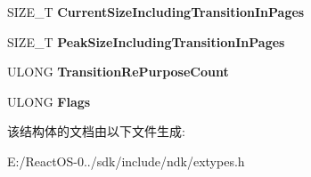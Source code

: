 \begin{DoxyCompactItemize}
S\+I\+Z\+E\+\_\+T {\bfseries Current\+Size\+Including\+Transition\+In\+Pages}
\item 
\mbox{\label{struct___s_y_s_t_e_m___f_i_l_e_c_a_c_h_e___i_n_f_o_r_m_a_t_i_o_n_af77c44343b7d807ba96af4355564a2ce}} 
S\+I\+Z\+E\+\_\+T {\bfseries Peak\+Size\+Including\+Transition\+In\+Pages}
\item 
\mbox{\label{struct___s_y_s_t_e_m___f_i_l_e_c_a_c_h_e___i_n_f_o_r_m_a_t_i_o_n_a4c9126260f3008e643d8275f14b7f92e}} 
U\+L\+O\+NG {\bfseries Transition\+Re\+Purpose\+Count}
\item 
\mbox{\label{struct___s_y_s_t_e_m___f_i_l_e_c_a_c_h_e___i_n_f_o_r_m_a_t_i_o_n_a1f6bd8c3a01bfffb4828b3861e233632}} 
U\+L\+O\+NG {\bfseries Flags}
\end{DoxyCompactItemize}


该结构体的文档由以下文件生成\+:\begin{DoxyCompactItemize}
\item 
E\+:/\+React\+O\+S-\/0../sdk/include/ndk/extypes.\+h\end{DoxyCompactItemize}
